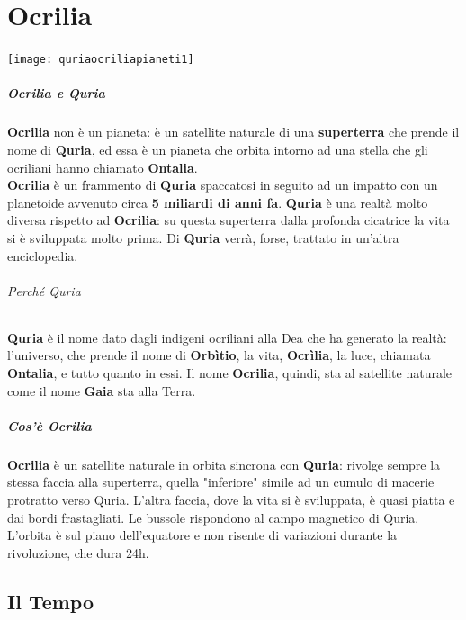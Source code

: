 \documentclass[10pt,twoside,onecolumn,openany]{book}
\begin{document}
\chapter{Ocrilia}
\begin{center}
\texttt{[image: quriaocriliapianeti1]}
\end{center}
\begin{multicols}{2}
\paragraph{Ocrilia e Quria} \textbf{Ocrilia} non è un pianeta: è un satellite naturale di una \textbf{superterra} che prende il nome di \textbf{Quria}, ed essa è un pianeta che orbita intorno ad una stella che gli ocriliani hanno chiamato \textbf{Ontalia}.\\
\textbf{Ocrilia} è un frammento di \textbf{Quria} spaccatosi in seguito ad un impatto con un planetoide avvenuto circa \textbf{5 miliardi di anni fa}. \textbf{Quria} è una realtà molto diversa rispetto ad \textbf{Ocrilia}: su questa superterra dalla profonda cicatrice la vita si è sviluppata molto prima. Di \textbf{Quria} verrà, forse, trattato in un'altra enciclopedia.
\columnbreak
\subparagraph{Perché Quria} \textbf{Quria} è il nome dato dagli indigeni ocriliani alla Dea che ha generato la realtà: l'universo, che prende il nome di \textbf{Orbìtio}, la vita, \textbf{Ocrìlia}, la luce, chiamata \textbf{Ontalia}, e tutto quanto in essi. Il nome \textbf{Ocrilia}, quindi, sta al satellite naturale come il nome \textbf{Gaia} sta alla Terra.
\end{multicols}
\paragraph{Cos'è Ocrilia} \textbf{Ocrilia} è un satellite naturale in orbita sincrona con \textbf{Quria}: rivolge sempre la stessa faccia alla superterra, quella "inferiore" simile ad un cumulo di macerie protratto verso Quria. L'altra faccia, dove la vita si è sviluppata, è quasi piatta e dai bordi frastagliati. Le bussole rispondono al campo magnetico di Quria. L'orbita è sul piano dell'equatore e non risente di variazioni durante la rivoluzione, che dura 24h.\\
\newpage
\section{Il Tempo}
\end{document}
